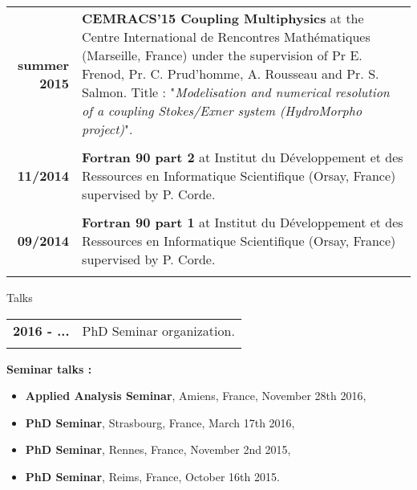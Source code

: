 \documentclass[10pt,a4paper]{report}
\begin{document}
\begin{center}
\begin{tabular}{r p{12cm}}
\textbf{summer 2015} & \textbf{CEMRACS'15 Coupling Multiphysics} at the Centre International de Rencontres Mathématiques (Marseille, France) under the supervision of Pr E. Frenod, Pr. C. Prud'homme, A. Rousseau and Pr. S. Salmon.\newline
Title : "\textit{Modelisation and numerical resolution of a coupling Stokes/Exner system (HydroMorpho project)}".\\

& \\

\textbf{11/2014} & \textbf{Fortran 90 part 2} at Institut du Développement et des Ressources en Informatique Scientifique (Orsay, France) supervised by P. Corde.\\

& \\

\textbf{09/2014} & \textbf{Fortran 90 part 1} at Institut du Développement et des Ressources en Informatique Scientifique (Orsay, France) supervised by P. Corde.\\

& \\

\end{tabular}
\end{center}


\vspace{1cm}
\noindent
{\selectfont
\begin{Large}
Talks
\end{Large}
\hrulefill
}

\vspace{0.6cm}
\noindent
\begin{center}
\begin{tabular}{r p{12cm}}
\textbf{2016 - ...} & PhD Seminar organization.\\

& \\

\end{tabular}
\end{center}


\vspace{0.4cm}
\noindent
{\selectfont
\textbf{Seminar talks :}
}

\begin{itemize}
\item \textbf{Applied Analysis Seminar}, Amiens, France, November 28th 2016,
\item \textbf{PhD Seminar}, Strasbourg, France, March 17th 2016,
\item \textbf{PhD Seminar}, Rennes, France, November 2nd 2015,
\item \textbf{PhD Seminar}, Reims, France, October 16th 2015.
\end{itemize}
\end{document}
